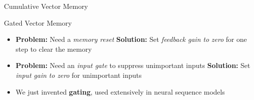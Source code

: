 \begin{slide}[\slideopts,toc={Vector Memory}]{Cumulative Vector Memory}
\vspace{-1em}
\vspace{-1em}
\end{slide}

\begin{slide}[\slideopts,toc={Gating}]{Gated Vector Memory}


\begin{itemize}
\item \textbf{Problem:} Need a \emph{memory reset}
\mpitem \textbf{Solution:} Set \emph{feedback gain to zero} for one step to clear the memory
\item[]
\mpitem \textbf{Problem:} Need an \emph{input gate} to suppress unimportant inputs
\mpitem \textbf{Solution:} Set \emph{input gain to zero} for unimportant inputs
\item[]
\mpitem We just invented \textbf{gating}, used extensively in neural sequence models
\end{itemize}

\end{slide}

